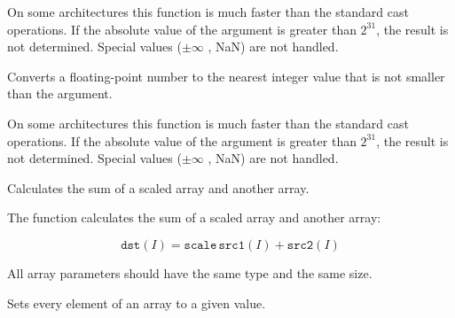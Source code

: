 \begin{description}
\end{description}

On some architectures this function is much faster than the standard cast
operations. If the absolute value of the argument is greater than
$2^{31}$, the result is not determined. Special values ($\pm \infty$ , NaN)
are not handled.


Converts a floating-point number to the nearest integer value that is not smaller than the argument.


\begin{description}
\end{description}

On some architectures this function is much faster than the standard cast
operations. If the absolute value of the argument is greater than
$2^{31}$, the result is not determined. Special values ($\pm \infty$ , NaN)
are not handled.

\fi


Calculates the sum of a scaled array and another array.


\begin{description}
\end{description}

The function calculates the sum of a scaled array and another array:

\[
\texttt{dst}(I)=\texttt{scale} \, \texttt{src1}(I) + \texttt{src2}(I)
\]

All array parameters should have the same type and the same size.

Sets every element of an array to a given value.


\begin{description}
\end{description}


